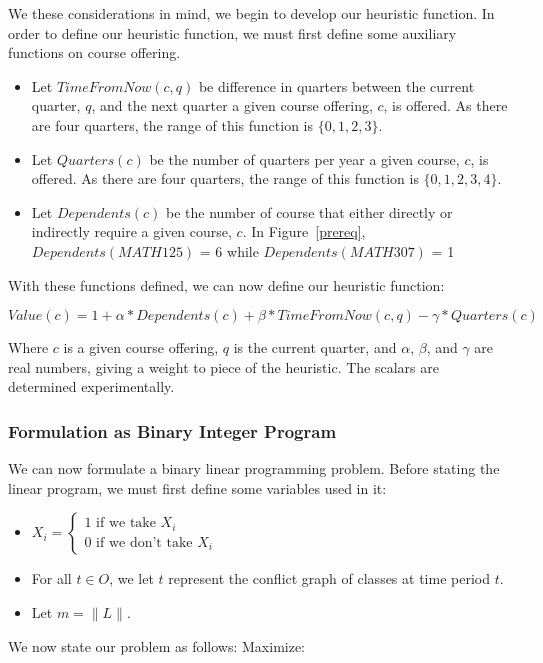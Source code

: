 \documentclass[11pt]{article} %
\begin{document}
We these considerations in mind, we begin to develop our heuristic function. In
order to define our heuristic function, we must first define some auxiliary
functions on course offering.  \begin{itemize} \item Let $TimeFromNow(c, q)$ be
difference in quarters between the current quarter, $q$, and the next quarter
a given course offering, $c$, is offered. As there are four quarters, the range
of this function is $\{0, 1, 2, 3\}$.  \item Let $Quarters(c)$ be the number of
quarters per year a given course, $c$, is offered. As there are four quarters,
the range of this function is $\{0, 1, 2, 3, 4\}$.  \item Let $Dependents(c)$ be
the number of course that either directly or indirectly require a given course,
$c$. In Figure~\ref{prereq}, $Dependents(MATH125)$ = 6 while
$Dependents(MATH307)$ = 1 \end{itemize}

With these functions defined, we can now define our heuristic function:

\begin{equation} 
    Value(c) = 1 + \alpha * Dependents(c) + \beta * TimeFromNow(c,q) 
    - \gamma * Quarters(c)
    \label{value_func}
\end{equation} 

Where $c$ is a given course offering,
$q$ is the current quarter, and $\alpha$, $\beta$, and $\gamma$ are real
numbers, giving a weight to piece of the heuristic. The scalars are determined
experimentally.

\subsubsection{Formulation as Binary Integer Program} We can now formulate
a binary linear programming problem. Before stating the linear
program, we must first define some variables used in it: 

\begin{itemize}
    \item $ X_i = \left\{ \begin{array}{lr} 1 \text{ if we take } X_i\\ 0 \text{ if
we don't take } X_i \end{array} \right. $ 
    \item For all $t \in O$, we let $t$ represent the conflict graph of classes
    at time period $t$.
    \item Let $m = \|L\|$.  
\end{itemize} 
We now state our problem as follows: 
Maximize: 
\end{document}
